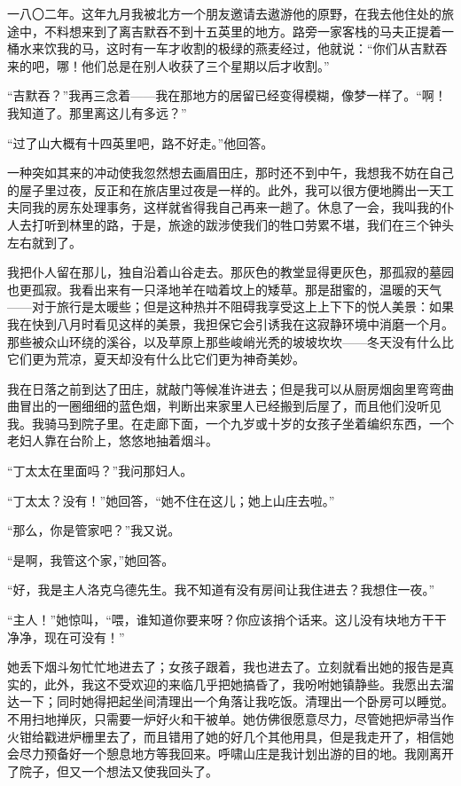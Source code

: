 \par 一八〇二年。这年九月我被北方一个朋友邀请去遨游他的原野，在我去他住处的旅途中，不料想来到了离吉默吞不到十五英里的地方。路旁一家客栈的马夫正提着一桶水来饮我的马，这时有一车才收割的极绿的燕麦经过，他就说：“你们从吉默吞来的吧，哪！他们总是在别人收获了三个星期以后才收割。”
\par “吉默吞？”我再三念着——我在那地方的居留已经变得模糊，像梦一样了。“啊！我知道了。那里离这儿有多远？”
\par “过了山大概有十四英里吧，路不好走。”他回答。
\par 一种突如其来的冲动使我忽然想去画眉田庄，那时还不到中午，我想我不妨在自己的屋子里过夜，反正和在旅店里过夜是一样的。此外，我可以很方便地腾出一天工夫同我的房东处理事务，这样就省得我自己再来一趟了。休息了一会，我叫我的仆人去打听到林里的路，于是，旅途的跋涉使我们的牲口劳累不堪，我们在三个钟头左右就到了。
\par 我把仆人留在那儿，独自沿着山谷走去。那灰色的教堂显得更灰色，那孤寂的墓园也更孤寂。我看出来有一只泽地羊在啮着坟上的矮草。那是甜蜜的，温暖的天气——对于旅行是太暖些；但是这种热并不阻碍我享受这上上下下的悦人美景：如果我在快到八月时看见这样的美景，我担保它会引诱我在这寂静环境中消磨一个月。那些被众山环绕的溪谷，以及草原上那些峻峭光秃的坡坡坎坎——冬天没有什么比它们更为荒凉，夏天却没有什么比它们更为神奇美妙。
\par 我在日落之前到达了田庄，就敲门等候准许进去；但是我可以从厨房烟囱里弯弯曲曲冒出的一圈细细的蓝色烟，判断出来家里人已经搬到后屋了，而且他们没听见我。我骑马到院子里。在走廊下面，一个九岁或十岁的女孩子坐着编织东西，一个老妇人靠在台阶上，悠悠地抽着烟斗。
\par “丁太太在里面吗？”我问那妇人。
\par “丁太太？没有！”她回答，“她不住在这儿；她上山庄去啦。”
\par “那么，你是管家吧？”我又说。
\par “是啊，我管这个家，”她回答。
\par “好，我是主人洛克乌德先生。我不知道有没有房间让我住进去？我想住一夜。”
\par “主人！”她惊叫，“喂，谁知道你要来呀？你应该捎个话来。这儿没有块地方干干净净，现在可没有！”
\par 她丢下烟斗匆忙忙地进去了；女孩子跟着，我也进去了。立刻就看出她的报告是真实的，此外，我这不受欢迎的来临几乎把她搞昏了，我吩咐她镇静些。我愿出去溜达一下；同时她得把起坐间清理出一个角落让我吃饭。清理出一个卧房可以睡觉。不用扫地掸灰，只需要一炉好火和干被单。她仿佛很愿意尽力，尽管她把炉帚当作火钳给戳进炉栅里去了，而且错用了她的好几个其他用具，但是我走开了，相信她会尽力预备好一个憩息地方等我回来。呼啸山庄是我计划出游的目的地。我刚离开了院子，但又一个想法又使我回头了。
